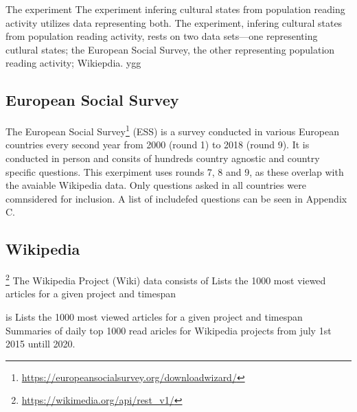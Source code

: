 The experiment 
The experiment infering cultural states from population reading activity utilizes data representing both. The experiment, infering cultural states from population reading activity, rests on two data sets—one representing cutlural states; the European Social Survey, the other representing population reading activity; Wikiepdia.
ygg


\subsection*{European Social Survey}

The European Social Survey\footnote{\url{https://europeansocialsurvey.org/downloadwizard/}} (ESS) is a survey conducted in various European countries every second year from 2000 (round 1) to 2018 (round 9). It is conducted in person and consits of hundreds country agnostic and country specific questions. This exerpiment uses rounds 7, 8 and 9, as these overlap with the avaiable Wikipedia data.
Only questions asked in all countries were comnsidered for inclusion. A list of includefed questions can be seen in Appendix C.

\subsection*{Wikipedia}

\footnote{\url{https://wikimedia.org/api/rest_v1/}}
The Wikipedia Project (Wiki) data consists of Lists the 1000 most viewed articles for a given project and timespan



is Lists the 1000 most viewed articles for a given project and timespan
Summaries of daily top 1000 read aricles for Wikipedia projects from july 1st 2015 untill 2020.

